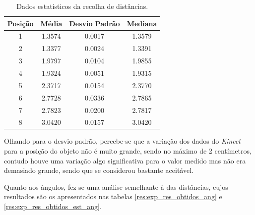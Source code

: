 \begin{table}[h!]
\begin{center}
\begin{tabular} { c c c c }
Posição & Média & Desvio Padrão & Mediana \\
\hline
1 & 1.3574 & 0.0017 & 1.3579 \\
2 & 1.3377 & 0.0024 & 1.3391\\
3 & 1.9797 & 0.0104 & 1.9855 \\
4 & 1.9324 & 0.0051 & 1.9315 \\
5 & 2.3717 & 0.0154 & 2.3770 \\
6 & 2.7728 & 0.0336 & 2.7865 \\
7 & 2.7823 & 0.0200 & 2.7817 \\
8 & 3.0420 & 0.0157 & 3.0420 \\
\hline
\end{tabular}
	\caption{Dados estatísticos da recolha de distâncias.}
	\label{res:exp_res_obtidos_est}
\end{center}
\end{table}

Olhando para o desvio padrão, percebe-se que a variação dos dados do \emph{Kinect} para a posição do objeto não é muito grande, sendo no máximo de 2 centímetros, contudo houve uma variação algo significativa para o valor medido mas não era demasiado grande, sendo que se considerou bastante aceitável.


Quanto aos ângulos, fez-se uma análise semelhante à das distâncias, cujos resultados são os apresentados nas tabelas \ref{res:exp_res_obtidos_ang} e \ref{res:exp_res_obtidos_est_ang}.

